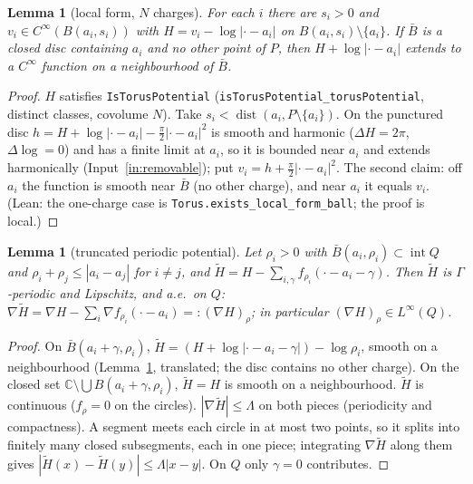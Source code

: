 \documentclass[11pt]{article}
\newtheorem{lemma}[theorem]{Lemma}
\theoremstyle{definition}
\theoremstyle{remark}
\newcommand{\C}{\mathbb C}
\DeclareMathOperator{\dist}{dist}
\begin{document}
\begin{lemma}[local form, $N$ charges]\label{lem:localform}
For each $i$ there are $s_i>0$ and $v_i\in C^\infty(B(a_i,s_i))$ with $H=v_i-\log|\cdot-a_i|$ on $B(a_i,s_i)\setminus\{a_i\}$. If $\bar B$ is a closed disc containing $a_i$ and
no other point of $P$, then $H+\log|\cdot-a_i|$ extends to a $C^\infty$ function on a neighbourhood of $\bar B$.
\end{lemma}
\begin{proof}
$H$ satisfies \texttt{IsTorusPotential} (\texttt{isTorusPotential\_torusPotential}, distinct classes, covolume $N$). Take $s_i<\dist(a_i,P\setminus\{a_i\})$. On the punctured disc
$h=H+\log|\cdot-a_i|-\frac\pi2|\cdot-a_i|^2$ is smooth and harmonic ($\Delta H=2\pi$, $\Delta\log=0$) and has a finite limit at $a_i$, so it is bounded near $a_i$ and
extends harmonically (Input~\ref{in:removable}); put $v_i=h+\frac\pi2|\cdot-a_i|^2$. The second claim: off $a_i$ the function is smooth near $\bar B$ (no other charge), and
near $a_i$ it equals $v_i$. (Lean: the one-charge case is \texttt{Torus.exists\_local\_form\_ball}; the proof is local.)
\end{proof}

\begin{lemma}[truncated periodic potential]\label{lem:Htilde}
Let $\rho_i>0$ with $\bar B(a_i,\rho_i)\subset\operatorname{int}Q$ and $\rho_i+\rho_j\le|a_i-a_j|$ for $i\ne j$, and $\tilde H=H-\sum_{i,\gamma}f_{\rho_i}(\cdot-a_i-\gamma)$. Then $\tilde H$ is $\Gamma$-periodic and
Lipschitz, and a.e.\ on $Q$: $\nabla\tilde H=\nabla H-\sum_i\nabla f_{\rho_i}(\cdot-a_i)=:(\nabla H)_\rho$; in particular $(\nabla H)_\rho\in L^\infty(Q)$.
\end{lemma}
\begin{proof}
On $\bar B(a_i+\gamma,\rho_i)$, $\tilde H=(H+\log|\cdot-a_i-\gamma|)-\log\rho_i$, smooth on a neighbourhood (Lemma~\ref{lem:localform}, translated; the disc contains no other
charge). On the closed set $\C\setminus\bigcup B(a_i+\gamma,\rho_i)$, $\tilde H=H$ is smooth on a neighbourhood. $\tilde H$ is continuous ($f_\rho=0$ on the circles).
$|\nabla\tilde H|\le\Lambda$ on both pieces (periodicity and compactness). A segment meets each circle in at most two points, so it splits into finitely many closed
subsegments, each in one piece; integrating $\nabla\tilde H$ along them gives $|\tilde H(x)-\tilde H(y)|\le\Lambda|x-y|$. On $Q$ only $\gamma=0$ contributes.
\end{proof}
\end{document}
